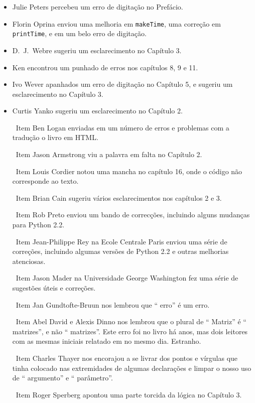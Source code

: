 \documentclass[10pt]{book}
\begin{document}
\begin {itemize}
\item Julie Peters percebeu um erro de digitação no Prefácio.

\item Florin Oprina enviou uma melhoria em {\tt makeTime},
uma correção em {\tt printTime}, e em um belo erro de digitação.

\item D.~J.~Webre sugeriu um esclarecimento no Capítulo 3.

\item Ken encontrou um punhado de erros nos capítulos 8, 9 e 11.

\item Ivo Wever apanhados um erro de digitação no Capítulo 5, e sugeriu um esclarecimento
no Capítulo 3.

\item Curtis Yanko sugeriu um esclarecimento no Capítulo 2.

\ Item Ben Logan enviadas em um número de erros e problemas com a tradução
o livro em HTML.

\ Item Jason Armstrong viu a palavra em falta no Capítulo 2.

\ Item Louis Cordier notou uma mancha no capítulo 16, onde o código
não corresponde ao texto.

\ Item Brian Cain sugeriu vários esclarecimentos nos capítulos 2 e 3.

\ Item Rob Preto enviou um bando de correcções, incluindo alguns
mudanças para Python 2.2.

\ Item Jean-Philippe Rey na Ecole Centrale
Paris enviou uma série de correções, incluindo algumas versões de Python 2.2
e outras melhorias atenciosas.

\ Item Jason Mader na Universidade George Washington fez uma série
de sugestões úteis e correções.

\ Item Jan Gundtofte-Bruun nos lembrou que `` erro'' é um erro.

\ Item Abel David e Alexis Dinno nos lembrou que o plural de
`` Matriz'' é `` matrizes'', e não `` matrizes''. Este erro foi no
livro há anos, mas dois leitores com as mesmas iniciais relatado em
no mesmo dia. Estranho.

\ Item Charles Thayer nos encorajou a se livrar dos pontos e vírgulas
que tinha colocado nas extremidades de algumas declarações e limpar o nosso
uso de `` argumento'' e `` parâmetro''.

\ Item Roger Sperberg apontou uma parte torcida da lógica no Capítulo 3.


\end{itemize}
\end{document}
